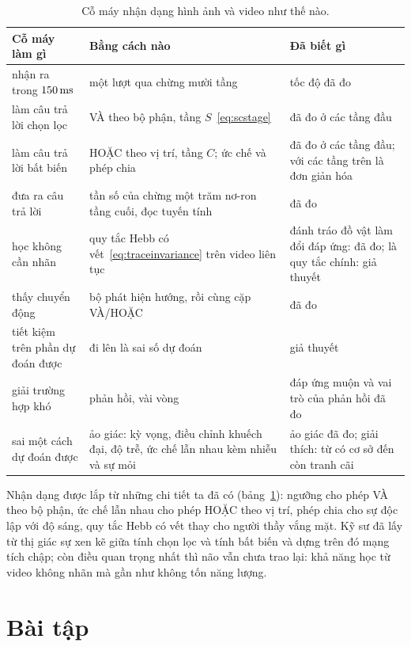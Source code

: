 \begin{table}[t]
\centering
\footnotesize
\setlength{\tabcolsep}{4pt}
\renewcommand{\arraystretch}{1.15}
\begin{tabular}{>{\raggedright}p{3.0cm}>{\raggedright}p{4.6cm}>{\raggedright\arraybackslash}p{5.2cm}}
\toprule
Cỗ máy làm gì & Bằng cách nào & Đã biết gì \\
\midrule
nhận ra trong $150\,\text{ms}$ & một lượt qua chừng mười tầng & tốc độ đã đo \\
làm câu trả lời chọn lọc & VÀ theo bộ phận, tầng $S$~\eqref{eq:scstage} & đã đo ở các tầng đầu \\
làm câu trả lời bất biến & HOẶC theo vị trí, tầng $C$; ức chế và phép chia & đã đo ở các tầng đầu; với các tầng trên là đơn giản hóa \\
đưa ra câu trả lời & tần số của chừng một trăm nơ-ron tầng cuối, đọc tuyến tính & đã đo \\
học không cần nhãn & quy tắc Hebb có vết~\eqref{eq:traceinvariance} trên video liên tục & đánh tráo đồ vật làm đổi đáp ứng: đã đo; là quy tắc chính: giả thuyết \\
thấy chuyển động & bộ phát hiện hướng, rồi cùng cặp VÀ/HOẶC & đã đo \\
tiết kiệm trên phần dự đoán được & đi lên là sai số dự đoán & giả thuyết \\
giải trường hợp khó & phản hồi, vài vòng & đáp ứng muộn và vai trò của phản hồi đã đo \\
sai một cách dự đoán được & ảo giác: kỳ vọng, điều chỉnh khuếch đại, độ trễ, ức chế lẫn nhau kèm nhiễu và sự mỏi & ảo giác đã đo; giải thích: từ có cơ sở đến còn tranh cãi \\
\bottomrule
\end{tabular}
\caption{Cỗ máy nhận dạng hình ảnh và video như thế nào.}
\label{tab:recognition}
\end{table}

Nhận dạng được lắp từ những chi tiết ta đã có (bảng~\ref{tab:recognition}): ngưỡng cho phép VÀ theo bộ phận, ức chế lẫn nhau cho phép HOẶC theo vị trí, phép chia cho sự độc lập với độ sáng, quy tắc Hebb có vết thay cho người thầy vắng mặt. Kỹ sư đã lấy từ thị giác sự xen kẽ giữa tính chọn lọc và tính bất biến và dựng trên đó mạng tích chập; còn điều quan trọng nhất thì não vẫn chưa trao lại: khả năng học từ video không nhãn mà gần như không tốn năng lượng.

\section{Bài tập}

